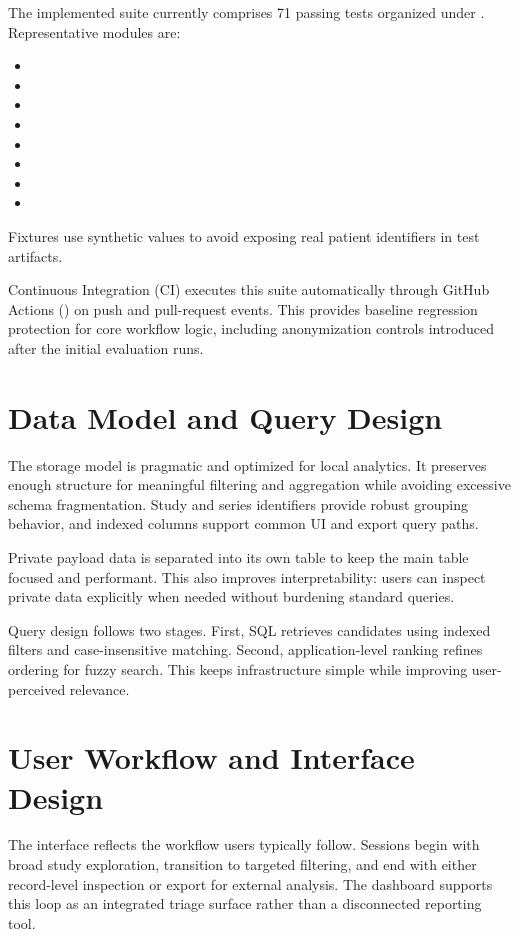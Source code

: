 The implemented suite currently comprises 71 passing tests organized under . Representative modules are:
\begin{itemize}
\item {}
\item {}
\item {}
\item {}
\item {}
\item {}
\item {}
\item {}
\end{itemize}
Fixtures use synthetic values to avoid exposing real patient identifiers in test artifacts.

Continuous Integration (CI) executes this suite automatically through GitHub Actions () on push and pull-request events. This provides baseline regression protection for core workflow logic, including anonymization controls introduced after the initial evaluation runs.

\section{Data Model and Query Design}

The storage model is pragmatic and optimized for local analytics. It preserves enough structure for meaningful filtering and aggregation while avoiding excessive schema fragmentation. Study and series identifiers provide robust grouping behavior, and indexed columns support common UI and export query paths.

Private payload data is separated into its own table to keep the main table focused and performant. This also improves interpretability: users can inspect private data explicitly when needed without burdening standard queries.

Query design follows two stages. First, SQL retrieves candidates using indexed filters and case-insensitive matching. Second, application-level ranking refines ordering for fuzzy search. This keeps infrastructure simple while improving user-perceived relevance.

\section{User Workflow and Interface Design}
The interface reflects the workflow users typically follow. Sessions begin with broad study exploration, transition to targeted filtering, and end with either record-level inspection or export for external analysis. The dashboard supports this loop as an integrated triage surface rather than a disconnected reporting tool.

